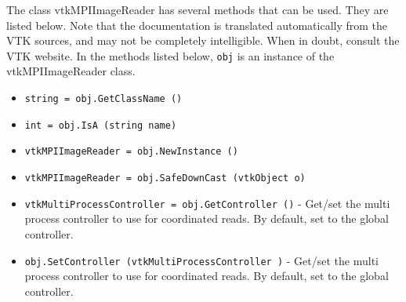 The class vtkMPIImageReader has several methods that can be used.
  They are listed below.
Note that the documentation is translated automatically from the VTK sources,
and may not be completely intelligible.  When in doubt, consult the VTK website.
In the methods listed below, \verb|obj| is an instance of the vtkMPIImageReader class.
\begin{itemize}
\item  \verb|string = obj.GetClassName ()|

\item  \verb|int = obj.IsA (string name)|

\item  \verb|vtkMPIImageReader = obj.NewInstance ()|

\item  \verb|vtkMPIImageReader = obj.SafeDownCast (vtkObject o)|

\item  \verb|vtkMultiProcessController = obj.GetController ()| -  Get/set the multi process controller to use for coordinated reads.  By
 default, set to the global controller.

\item  \verb|obj.SetController (vtkMultiProcessController )| -  Get/set the multi process controller to use for coordinated reads.  By
 default, set to the global controller.

\end{itemize}
